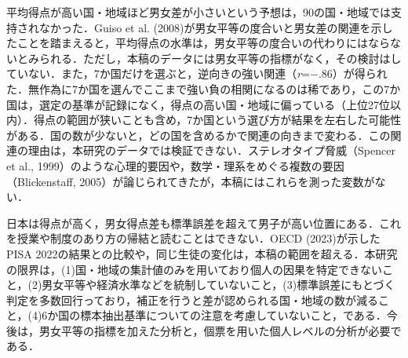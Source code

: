 \documentclass[a4paper,10pt,twocolumn]{ltjsarticle}
\begin{document}
平均得点が高い国・地域ほど男女差が小さいという予想は，90の国・地域では支持されなかった．Guiso et al. (2008)が男女平等の度合いと男女差の関連を示したことを踏まえると，平均得点の水準は，男女平等の度合いの代わりにはならないとみられる．ただし，本稿のデータには男女平等の指標がなく，その検討はしていない．また，7か国だけを選ぶと，逆向きの強い関連（\textit{r}=−.86）が得られた．無作為に7か国を選んでここまで強い負の相関になるのは稀であり，この7か国は，選定の基準が記録になく，得点の高い国・地域に偏っている（上位27位以内）．得点の範囲が狭いことも含め，7か国という選び方が結果を左右した可能性がある．国の数が少ないと，どの国を含めるかで関連の向きまで変わる．この関連の理由は，本研究のデータでは検証できない．ステレオタイプ脅威（Spencer et al., 1999）のような心理的要因や，数学・理系をめぐる複数の要因（Blickenstaff, 2005）が論じられてきたが，本稿にはこれらを測った変数がない．

日本は得点が高く，男女得点差も標準誤差を超えて男子が高い位置にある．これを授業や制度のあり方の帰結と読むことはできない．OECD (2023)が示したPISA 2022の結果との比較や，同じ生徒の変化は，本稿の範囲を超える．本研究の限界は，(1)国・地域の集計値のみを用いており個人の因果を特定できないこと，(2)男女平等や経済水準などを統制していないこと，(3)標準誤差にもとづく判定を多数回行っており，補正を行うと差が認められる国・地域の数が減ること，(4)6か国の標本抽出基準についての注意を考慮していないこと，である．今後は，男女平等の指標を加えた分析と，個票を用いた個人レベルの分析が必要である．
\end{document}
